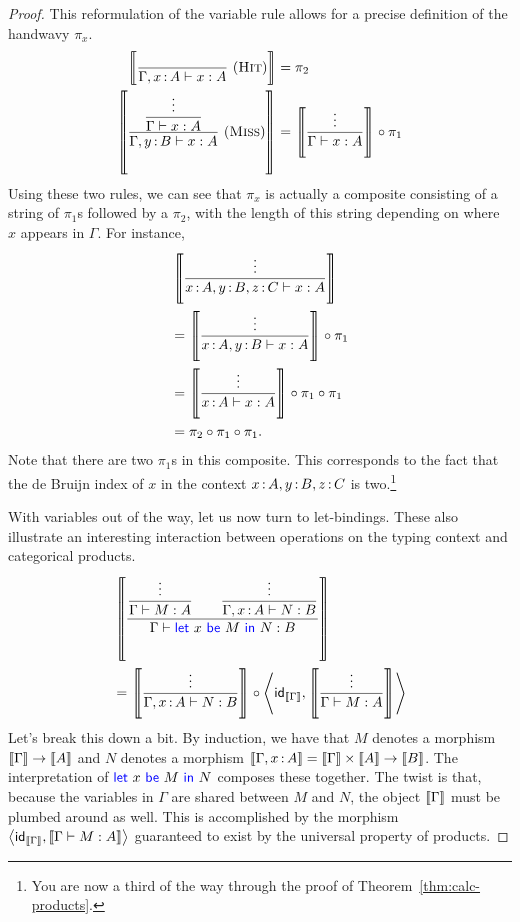 \begin{proof}
  This reformulation of the variable rule allows for a precise
  definition of the handwavy \(\pi_x\).
  \begin{align}
    \left\llbracket 
      \frac
        {~}
        {\Gamma,x\,{:}\, A \vdash x : A}
        ~(\textsc{Hit})
    \right\rrbracket
    &= \pi_2
    \\
    \left\llbracket 
      \frac
        {\displaystyle\frac{\vdots}{\Gamma \vdash x : A}}
        {\Gamma,y\,{:}\, B \vdash x : A}
        ~(\textsc{Miss})
    \right\rrbracket
    &=
    \left\llbracket 
      \frac{\vdots}{\Gamma \vdash x : A}
    \right\rrbracket
    \circ \pi_1
  \end{align}
  Using these two rules,
  we can see that \(\pi_x\) is actually a composite consisting of a string of \(\pi_1\)s followed by a \(\pi_2\),
  with the length of this string depending on where \(x\) appears in \(\Gamma\). For instance,
  \begin{align}
    &\left\llbracket \frac{\vdots}{x\,{:}\, A, y\,{:}\, B, z\,{:}\, C \vdash x : A}\right\rrbracket \\
    &=
    \left\llbracket \frac{\vdots}{x\,{:}\, A, y\,{:}\, B \vdash x : A}\right\rrbracket \circ \pi_1 \\
    &=
    \left\llbracket \frac{\vdots}{x\,{:}\, A \vdash x : A}\right\rrbracket \circ \pi_1 \circ \pi_1 \\
    &=
    \pi_2 \circ \pi_1 \circ \pi_1.
  \end{align}
  Note that there are two \(\pi_1\)s in this composite. This corresponds to the fact that
  the de Bruijn index of \(x\) in the context \(x\,{:}\, A,y\,{:}\, B,z\,{:}\, C\) is two.\footnote{%
    You are now a third of the way through
  the proof of Theorem~\ref{thm:calc-products}.}


  With variables out of the way, let us now turn to let-bindings.
  These also illustrate an interesting interaction
  between operations on the typing context and categorical products.
  \begin{align*}
    &\left\llbracket 
      \frac
      {
        \displaystyle\frac{\vdots}{\Gamma\vdash M : A}
        \qquad
        \displaystyle\frac{\vdots}{\Gamma,x\,{:}\, A\vdash N : B}
      }
      {\Gamma\vdash \mathsf{{\color{blue}let}}~x~\mathsf{{\color{blue}be}}~M~\mathsf{{\color{blue}in}}~N : B}
    \right\rrbracket
    \\
    &=
    \left\llbracket \frac{\vdots}{\Gamma,x\,{:}\, A \vdash N : B}\right\rrbracket
    \circ
    \left\langle
    \mathsf{id}_{\left\llbracket \Gamma\right\rrbracket}
    ,
    \left\llbracket \frac{\vdots}{\Gamma\vdash M : A}\right\rrbracket
    \right\rangle
  \end{align*}
  Let's break this down a bit.
  By induction, we have that
  \(M\) denotes a morphism \(\left\llbracket \Gamma\right\rrbracket \to \left\llbracket A\right\rrbracket\)
  and \(N\) denotes a morphism \(\left\llbracket \Gamma,x\,{:}\, A\right\rrbracket = \left\llbracket \Gamma\right\rrbracket\times\left\llbracket A\right\rrbracket \to \left\llbracket B\right\rrbracket\).
  The interpretation of \(\mathsf{{\color{blue}let}}~x~\mathsf{{\color{blue}be}}~M~\mathsf{{\color{blue}in}}~N\)
  composes these together. The twist is that,
  because the variables in \(\Gamma\) are shared between \(M\)
  and \(N\), the object \(\left\llbracket \Gamma\right\rrbracket\) must be
  plumbed around as well.
  This is accomplished by the morphism
  \(
    \left\langle
    \mathsf{id}_{\left\llbracket \Gamma\right\rrbracket}
    ,
    \left\llbracket \Gamma\vdash M : A\right\rrbracket
    \right\rangle\)
    guaranteed to exist
    by the universal property of products.


\end{proof}
